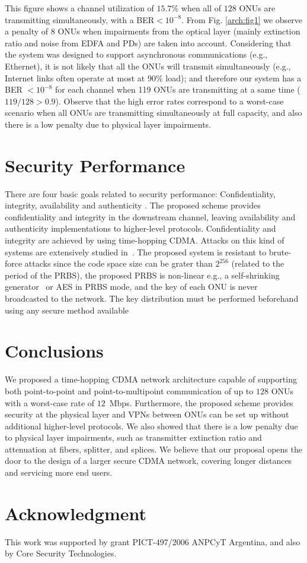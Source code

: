 \documentclass[10pt]{article}
\begin{document}
This figure shows a channel utilization of $15.7\%$ when all of $128$ ONUs
are transmitting simultaneously, with a BER$<10^{-8}$. 
From Fig. \ref{arch:fig1} we observe a penalty of $8$ ONUs when
impairments from the optical layer (mainly extinction ratio and noise from EDFA and PDs) are taken into account.
Considering that the system was designed to support asynchronous communications (e.g., Ethernet), it is not likely that all the ONUs will transmit simultaneously (e.g., Internet links often operate at most at $90\%$ load); and therefore our system has a BER $<10^{-8}$ for each channel when 119 ONUs are transmitting at a same time ($119/128>0.9$).
Observe that the high error rates correspond to a
worst-case scenario when all ONUs are transmitting simultaneously at
full capacity, and also 
there is a low penalty due to physical layer impairments.

\section{Security Performance}
There are four basic goals related to security performance: Confidentiality, integrity, availability and authenticity \cite{Dhillon:07}.
The proposed scheme provides confidentiality and integrity in the downstream channel, leaving availability and authenticity implementations to higher-level protocols. Confidentiality and integrity are achieved by using time-hopping CDMA.
Attacks on this kind of systems are extensively studied in~\cite{Shake:05}. The proposed system is resistant to brute-force attacks since the code space size can be grater than $2^{256}$ (related to the period of the PRBS), the proposed PRBS is non-linear e.g., a self-shrinking generator~\cite{Meier:94} or AES in PRBS mode, and the key of each ONU is never broadcasted to the network. The key distribution must be performed beforehand using any secure method available~\cite{Denning:82}


\section{Conclusions}
We proposed a time-hopping CDMA network architecture capable of
supporting both point-to-point and point-to-multipoint communication of
up to $128$ ONUs with a worst-case rate of $12$~Mbps. Furthermore, the
proposed scheme provides security at the physical layer and VPNs between
ONUs can be set up without additional higher-level protocols.  We also
showed that there is a low penalty due to physical
layer
impairments, such as transmitter extinction ratio and attenuation at
fibers, splitter, and splices.
We believe that our proposal opens the door to the design of a larger
secure
CDMA network, covering longer distances and servicing more end users.


\section*{Acknowledgment}
This work was supported by grant PICT-497/2006 ANPCyT Argentina, and also by Core Security Technologies.



\end{document}
